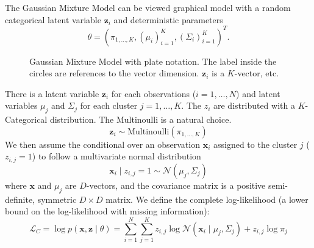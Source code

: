 \documentclass{article}
\numberwithin{equation}{section}
\begin{document}
The Gaussian Mixture  Model can be viewed graphical model with a random categorical latent 
variable  $\mathbf{z}_i$ and deterministic parameters 
$$\theta = (\pi_{1,\dots,K}, (\mu_i)_{i = 1}^K, (\Sigma_i)_{i = 1}^K)^T.$$
\begin{figure}[H]
        \centering
        \caption{Gaussian Mixture Model with plate notation. The label inside the circles 
        are references to the vector dimension. $\mathbf{z}_i$ is a $K$-vector, etc.}
        \label{fig:GMM}
\end{figure}



There is a  latent variable $\mathbf{z}_i$ for each observations ($i=1,\dots, N$) and latent variables $\mu_j$ and $\Sigma_j$ for each cluster $j = 1,\dots,K$. The $z_{i}$ are distributed with a $K$-Categorical distribution. The Multinoulli is a natural choice.
$$
  \mathbf{z}_i \sim \text{Multinoulli}(\pi_{1,\dots,K})
$$
We then assume the conditional over an observation $\mathbf{x}_i$ assigned to the cluster $j$ ($z_{i, j} = 1$) to follow a multivariate normal distribution
$$
\mathbf{x}_i \mid z_{i, j} = 1 \sim \mathcal{N}(\mu_j, \Sigma_j)
$$
where $\mathbf{x}$ and $\mu_j$ are $D$-vectors, and the covariance 
matrix is a positive semi-definite, symmetric $D \times D$ matrix. We define 
the complete log-likelihood (a lower bound on the log-likelihood with missing 
information):
$$
\mathcal{L}_C = \log p(\mathbf{x}, \mathbf{z} \mid  \theta) = \sum_{i = 1}^N \sum_{j = 1}^K
    z_{i, j} \log \mathcal{N}(\mathbf{x}_i \mid \mu_j , \Sigma_j) 
    + z_{i, j} \log \pi_j
$$
\end{document}
